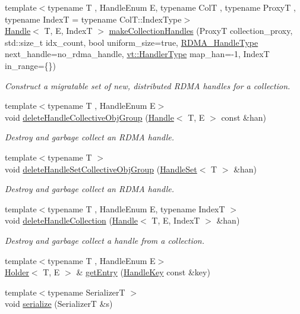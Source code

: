 \begin{DoxyCompactItemize}
{\footnotesize template$<$typename T , Handle\+Enum E, typename ColT , typename ProxyT , typename IndexT  = typename Col\+T\+::\+Index\+Type$>$ }\\\hyperlink{structvt_1_1rdma_1_1_handle}{Handle}$<$ T, E, IndexT $>$ \hyperlink{structvt_1_1rdma_1_1_manager_aad62be5c2cb0225139cf3d665b5fd7f2}{make\+Collection\+Handles} (ProxyT collection\+\_\+proxy, std\+::size\+\_\+t idx\+\_\+count, bool uniform\+\_\+size=true, \hyperlink{namespacevt_a10442579ec4e7ebef223818e64bcf908}{R\+D\+M\+A\+\_\+\+Handle\+Type} next\+\_\+handle=no\+\_\+rdma\+\_\+handle, \hyperlink{namespacevt_af64846b57dfcaf104da3ef6967917573}{vt\+::\+Handler\+Type} map\+\_\+han=-\/1, IndexT in\+\_\+range=\{\})
\begin{DoxyCompactList}\small\item\em Construct a migratable set of new, distributed R\+D\+MA handles for a collection. \end{DoxyCompactList}\item 
{\footnotesize template$<$typename T , Handle\+Enum E$>$ }\\void \hyperlink{structvt_1_1rdma_1_1_manager_a4219310feca011fd242e654c9ba51280}{delete\+Handle\+Collective\+Obj\+Group} (\hyperlink{structvt_1_1rdma_1_1_handle}{Handle}$<$ T, E $>$ const \&han)
\begin{DoxyCompactList}\small\item\em Destroy and garbage collect an R\+D\+MA handle. \end{DoxyCompactList}\item 
{\footnotesize template$<$typename T $>$ }\\void \hyperlink{structvt_1_1rdma_1_1_manager_a9b3b9bf148a8225295879481345e4af3}{delete\+Handle\+Set\+Collective\+Obj\+Group} (\hyperlink{structvt_1_1rdma_1_1_handle_set}{Handle\+Set}$<$ T $>$ \&han)
\begin{DoxyCompactList}\small\item\em Destroy and garbage collect an R\+D\+MA handle. \end{DoxyCompactList}\item 
{\footnotesize template$<$typename T , Handle\+Enum E, typename IndexT $>$ }\\void \hyperlink{structvt_1_1rdma_1_1_manager_a3a1f982e986d58e91837a2b1aa048468}{delete\+Handle\+Collection} (\hyperlink{structvt_1_1rdma_1_1_handle}{Handle}$<$ T, E, IndexT $>$ \&han)
\begin{DoxyCompactList}\small\item\em Destroy and garbage collect a handle from a collection. \end{DoxyCompactList}\item 
{\footnotesize template$<$typename T , Handle\+Enum E$>$ }\\\hyperlink{structvt_1_1rdma_1_1_holder}{Holder}$<$ T, E $>$ \& \hyperlink{structvt_1_1rdma_1_1_manager_a60c463246971a6d782e55f13fd60d092}{get\+Entry} (\hyperlink{structvt_1_1rdma_1_1_handle_key}{Handle\+Key} const \&key)
\item 
{\footnotesize template$<$typename SerializerT $>$ }\\void \hyperlink{structvt_1_1rdma_1_1_manager_a72546bf67b9df25c54bfca2106872ea3}{serialize} (SerializerT \&s)
\end{DoxyCompactItemize}
